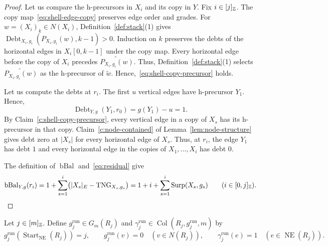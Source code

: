 \begin{proof}
 Let us compare the h-precursors in $X_i$ and its copy in $Y$.
Fix $i\in[j]_{\mathbb Z}$.
The copy map~\eqref{eq:shell-edge-copy} preserves edge order and grades.
For $w=(X_i)_k\in N(X_i)$, Definition~\ref{def:stack}(1) gives $\operatorname{Debt}_{X_i,g_i}(P_{X_i,g_i}(w),k-1)>0$.
Induction on $k$ preserves the debts of the horizontal edges in $X_i[0,k-1]$ under the copy map.
Every horizontal edge before the copy of $X_i$ precedes $\widetilde{P_{X_i,g_i}(w)}$.
Thus, Definition~\ref{def:stack}(1) selects $\widetilde{P_{X_i,g_i}(w)}$ as the h-precursor of $\widetilde w$.
Hence,~\eqref{eq:shell-copy-precursor} holds.

 Let us compute the debts at $r_i$.
The first $u$ vertical edges have h-precursor $Y_1$.
Hence,
\[
 \operatorname{Debt}_{Y,g}(Y_1,r_0)=g(Y_1)-u=1.
\]
By Claim~\ref{c:shell-copy-precursor}, every vertical edge in a copy of $X_s$ has its h-precursor in that copy.
Claim~\ref{c:node-contained} of Lemma~\ref{lem:node-structure} gives debt zero at $|X_s|$ for every horizontal edge of $X_s$.
Thus, at $r_i$, the edge $Y_1$ has debt $1$ and every horizontal edge in the copies of $X_1,\ldots,X_i$ has debt $0$.

 The definition of $\operatorname{bBal}$ and~\eqref{eq:residual} give
\[
 \operatorname{bBal}_{Y,g}(r_i)
 =1+\sum_{s=1}^i\bigl(|X_s|_E-\operatorname{TNG}_{X_s,g_s}\bigr)
 =1+i+\sum_{s=1}^i\operatorname{Surp}(X_s,g_s)
 \qquad(i\in[0,j]_{\mathbb Z}).
\]
\end{proof}

\begin{definition}\label{def:simple-run-grading}
Let $j\in[m]_{\mathbb Z}$.
Define $g_j^{\mathrm{run}}\in G_m(R_j)$ and $\gamma_j^{\mathrm{run}}\in\operatorname{Col}(R_j,g_j^{\mathrm{run}},m)$ by
\[
 g_j^{\mathrm{run}}(\operatorname{Start}_{\mathrm{NE}}(R_j))=j,\qquad
 g_j^{\mathrm{run}}(v)=0\quad(v\in N(R_j)),\qquad
 \gamma_j^{\mathrm{run}}(e)=1\quad(e\in\operatorname{NE}(R_j)).
\]
\end{definition}

